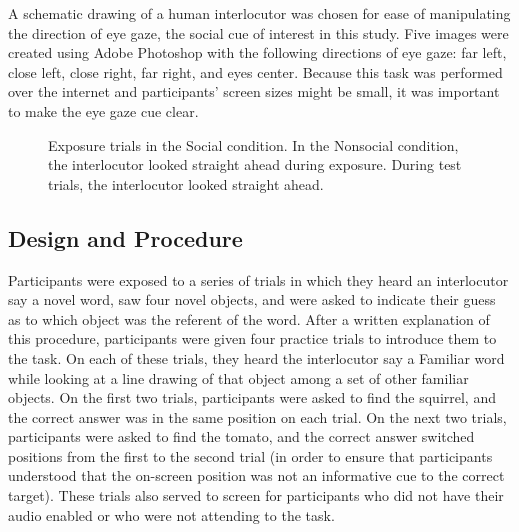 \documentclass[10pt,letterpaper]{article}
\begin{document}
A schematic drawing of a human interlocutor was chosen for ease of manipulating the direction of eye gaze, the social cue of interest in this study. Five images were created using Adobe Photoshop with the following directions of eye gaze: far left, close left, close right, far right, and eyes center. Because this task was performed over the internet and participants' screen sizes might be small, it was important to make the eye gaze cue clear.
%
\begin{figure}
	\centering
	\caption{Exposure trials in the Social condition. In the Nonsocial condition, the interlocutor looked straight ahead during exposure. During test trials, the interlocutor looked straight ahead.}
\end{figure}
%
\subsection{Design and Procedure}
Participants were exposed to a series of trials in which they heard an interlocutor say a novel word, saw
four novel objects, and were asked to indicate their guess as to which object was the
referent of the word. After a written explanation of this procedure, participants were given
four practice trials to introduce them to the task. On each of these trials, they heard the interlocutor say a
Familiar word while looking at a line drawing of that object among a set of other familiar objects.
On the first two trials, participants were asked to find the squirrel, and the correct answer
was in the same position on each trial. On the next two trials, participants were asked to
find the tomato, and the correct answer switched positions from the first to the second
trial (in order to ensure that participants understood that the on-screen position was not
an informative cue to the correct target). These trials also served to screen for participants
who did not have their audio enabled or who were not attending to the task.
\end{document}
